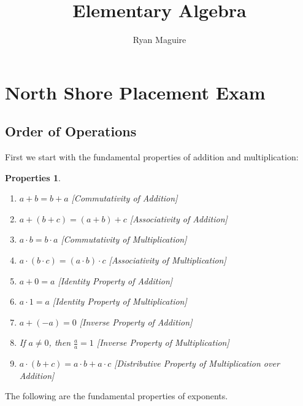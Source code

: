 \documentclass{article}
\title{Elementary Algebra}
\author{Ryan Maguire}
\date{\vspace{-5ex}}
\theoremstyle{mystyle}
\newtheorem{properties}{Properties}[section]
\begin{document}
\maketitle
\tableofcontents
\section{North Shore Placement Exam}
\subsection{Order of Operations}
First we start with the fundamental properties of addition and multiplication:
\begin{properties}
\label{property:North_Shore_Arithmetic_Properties}
\
\begin{enumerate}[itemsep=0pt]
    \item \label{property:North_Shore_Arithmetic_Properties_Com_Add} $a+b = b+a$ \hfill [Commutativity of Addition]
    \item \label{property:north_shore_arithmetic_properties_assoc_add} $a+(b+c) = (a+b)+c$ \hfill [Associativity of Addition]
    \item \label{property:north_shore_arithmetic_properties_comm_mult} $a\cdot b = b \cdot a$ \hfill [Commutativity of Multiplication]
    \item \label{property:north_shore_arithmetic_properties_assoc_mult} $a\cdot (b\cdot c) = (a\cdot b)\cdot c$ \hfill [Associativity of Multiplication]
    \item \label{property:north_shore_arithmetic_properties_add_idenity} $a+0 = a$ \hfill [Identity Property of Addition]
    \item \label{property:north_shore_arithmetic_properties_mult_identity} $a\cdot 1 = a$ \hfill [Identity Property of Multiplication]
    \item \label{property:north_shore_arithmetic_properties_add_inverse} $a + (-a) = 0$ \hfill [Inverse Property of Addition]
    \item \label{property:north_shore_arithmetic_properties_mult_inverse} If $a\ne 0$, then $\frac{a}{a} = 1$ \hfill [Inverse Property of Multiplication]
    \item \label{property:north_shore_arithmetic_properties_distributive_property} $a\cdot (b+c) = a\cdot b + a\cdot c$ \hfill [Distributive Property of Multiplication over Addition]
\end{enumerate}
\end{properties}
The following are the fundamental properties of exponents.
\end{document}
